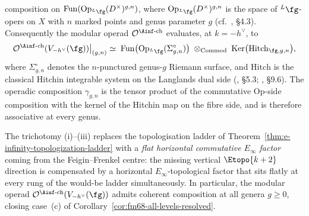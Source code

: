 \begin{theorem}
\begin{enumerate}[label=\textup{(\roman*)}]
 composition on $\mathrm{Fun}(\mathrm{Op}_{{}^L\fg}(D^\times)^{g,n})$,
 where $\mathrm{Op}_{{}^L\fg}(D^\times)^{g,n}$ is the space of
 ${}^L\fg$-opers on $X$ with $n$ marked points and genus parameter
 $g$ (cf.~\cite{FrenkelLanglands}, \S 4.3). Consequently the modular
 operad $\mathcal{O}^{\Ainf\text{-ch}}$ evaluates, at $k=-h^\vee$,
 to
\begin{equation}\label{eq:ff-chirhoch-critical-evaluation}
 \mathcal{O}^{\Ainf\text{-ch}}(V_{-h^\vee}(\fg))\bigl|_{(g,n)}
 \;\simeq\;
 \mathrm{Fun}\bigl(\mathrm{Op}_{{}^L\fg}(\Sigma_{g,n}^\circ)\bigr)
 \;\otimes_{\mathrm{Commod}}\;
 \mathrm{Ker}\bigl(\mathrm{Hitch}_{\fg, g, n}\bigr),
\end{equation}
 where $\Sigma_{g,n}^\circ$ denotes the $n$-punctured genus-$g$
 Riemann surface, and $\mathrm{Hitch}$ is the classical Hitchin
 integrable system on the Langlands dual side
 (\cite{BD04}, \S 5.3; \cite{FrenkelLanglands}, \S 9.6). The
 operadic composition $\gamma_{g,n}$ is the tensor product of the
 commutative Op-side composition with the kernel of the Hitchin map
 on the fibre side, and is therefore associative at every genus.
\end{enumerate}
The trichotomy (i)--(iii) replaces the topologisation ladder of
Theorem~\ref{thm:e-infinity-topologization-ladder} with a
\emph{flat horizontal commutative $E_\infty$ factor} coming from the
Feigin--Frenkel centre: the missing vertical $\Etopo{k+2}$
direction is compensated by a horizontal $E_\infty$-topological
factor that sits flatly at every rung of the would-be ladder
simultaneously. In particular, the modular operad
$\mathcal{O}^{\Ainf\text{-ch}}(V_{-h^\vee}(\fg))$ admits coherent
composition at all genera $g \ge 0$, closing case~(c) of
Corollary~\textup{\ref{cor:fm68-all-levels-resolved}}.
\end{theorem}

